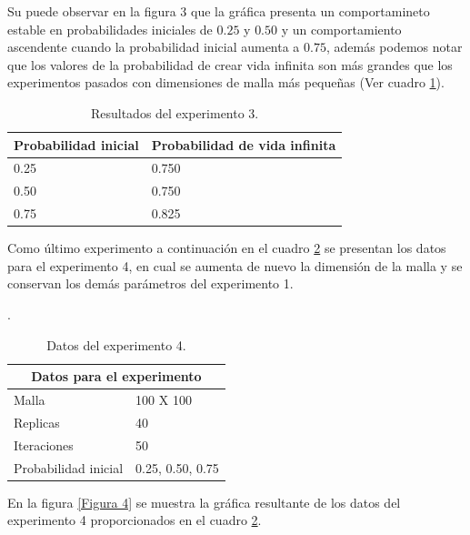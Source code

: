 \documentclass{article}
\begin{document}
Su puede observar en la figura 3 que la gráfica presenta un comportamineto estable en probabilidades iniciales de $0.25$ y $0.50$ y un comportamiento ascendente cuando la probabilidad inicial aumenta a $0.75$, además podemos notar que los valores de la probabilidad de crear vida infinita son más grandes que los experimentos pasados con dimensiones de malla más pequeñas (Ver cuadro \ref{Cuadro 6}).

\begin{table}[ht]
\centering
\begin{tabular}{ |p{3cm}||p{5cm}|}
 \hline
 Probabilidad inicial & Probabilidad de vida infinita\\
 \hline
 0.25 & 0.750 \\
 \hline
 0.50 & 0.750 \\
 \hline
 0.75 & 0.825 \\
 \hline
\end{tabular}
\caption{Resultados del experimento 3.}
\label{Cuadro 6}
\end{table}

\bigskip
Como último experimento a continuación en el cuadro \ref{Cuadro7} se presentan los datos para el experimento 4, en cual se aumenta de nuevo la dimensión de la malla y se conservan los demás parámetros del experimento 1.

\newpage
.
\bigskip

\begin{table}[ht]
\centering
\begin{tabular}{ |p{3cm}||p{5cm}|}
 \hline
 \multicolumn{2}{|c|}{Datos para el experimento} \\
 \hline
 Malla       & 100 X 100 \\
 \hline
 Replicas    & 40 \\
 \hline
 Iteraciones & 50 \\
 \hline
 Probabilidad inicial & 0.25, 0.50, 0.75 \\
 \hline
\end{tabular}
\caption{Datos del experimento 4.}
\label{Cuadro7}
\end{table}

En la figura \ref{Figura 4} se muestra la gráfica resultante de los datos del experimento 4 proporcionados en el cuadro \ref{Cuadro7}. 
\end{document}
